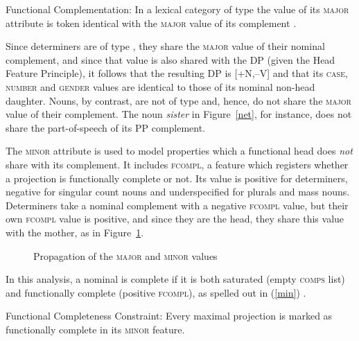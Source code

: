 \documentclass[output=paper
	        ,collection
	        ,collectionchapter
 	        ,biblatex
                ,babelshorthands
                ,newtxmath
                ,draftmode
                ,colorlinks, citecolor=brown
]{langscibook}
\begin{document}
\begin{exe} 
\ex\label{maj} Functional Complementation: In a lexical category of type  the value of its \textsc{major} 
      attribute is token identical with the \textsc{major} value of its complement \citep[311--312]{Netter94}.  
\end{exe} 

\noindent
Since determiners are of type , they share the \textsc{major} value of their 
nominal complement, and since that value is 
also shared with the DP (given the Head Feature Principle), it follows that the resulting 
DP is [+N,--V] and that its \textsc{case}, \textsc{number} and \textsc{gender} values are 
identical to those of its nominal non-head daughter. 
Nouns, by contrast, are not of type  and, hence, do not share the 
\textsc{major} value of their complement. The noun \emph{sister} 
in Figure~\ref{net}, for instance, does not share the part-of-speech of its PP complement. 

The \textsc{minor} attribute is used to model properties which a functional head 
does {\em not} share with its complement. It includes \textsc{fcompl}, a feature which 
registers whether a projection is functionally complete or not. Its value is positive for 
determiners, negative for singular count nouns and underspecified for plurals and mass nouns.  
Determiners take a nominal complement with a negative \textsc{fcompl} value, but their 
own \textsc{fcompl} value is positive, and since they are the head, they share this value with 
the mother, as in Figure~\ref{netter}. 

\begin{figure}
\caption{\label{netter} Propagation of the \textsc{major} and \textsc{minor} values}
\end{figure}

In this analysis, a nominal is complete if it is both saturated 
(empty \textsc{comps} list) and functionally complete (positive \textsc{fcompl}), as 
spelled out in (\ref{min}) \citep[312]{Netter94}.

\begin{exe} 
\ex\label{min} Functional Completeness Constraint: Every maximal projection is marked  
      as functionally complete in its \textsc{minor} feature. 
\end{exe}
\end{document}
